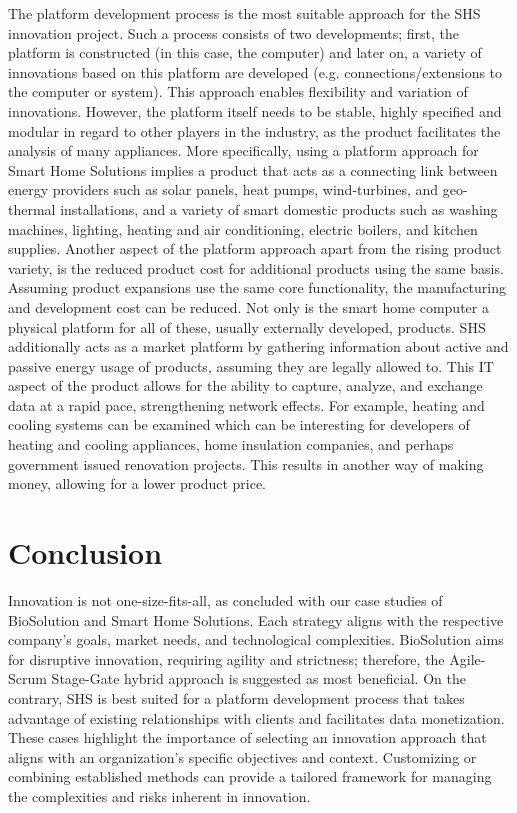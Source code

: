 \documentclass[a4paper,10pt,UTF8]{scrartcl}
\begin{document}
The platform development process is the most suitable approach for the SHS innovation project. Such a process consists of two developments; first, the platform is constructed (in this case, the computer) and later on, a variety of innovations based on this platform are developed (e.g. connections/extensions to the computer or system). This approach enables flexibility and variation of innovations. However, the platform itself needs to be stable, highly specified and modular in regard to other players in the industry, as the product facilitates the analysis of many appliances. More specifically, using a platform approach for Smart Home Solutions implies a product that acts as a connecting link between energy providers such as solar panels, heat pumps, wind-turbines, and geo-thermal installations, and a variety of smart domestic products such as washing machines, lighting, heating and air conditioning, electric boilers, and kitchen supplies. Another aspect of the platform approach apart from the rising product variety, is the reduced product cost for additional products using the same basis. Assuming product expansions use the same core functionality, the manufacturing and development cost can be reduced. Not only is the smart home computer a physical platform for all of these, usually externally developed, products. SHS additionally acts as a market platform by gathering information about active and passive energy usage of products, assuming they are legally allowed to. This IT aspect of the product allows for the ability to capture, analyze, and exchange data at a rapid pace, strengthening network effects. For example, heating and cooling systems can be examined which can be interesting for developers of heating and cooling appliances, home insulation companies, and perhaps government issued renovation projects. This results in another way of making money, allowing for a lower product price. 



\section{Conclusion}

Innovation is not one-size-fits-all, as concluded with our case studies of BioSolution and Smart Home Solutions. Each strategy aligns with the respective company's goals, market needs, and technological complexities. BioSolution aims for disruptive innovation, requiring agility and strictness; therefore, the Agile-Scrum Stage-Gate hybrid approach is suggested as most beneficial. On the contrary, SHS is best suited for a platform development process that takes advantage of existing relationships with clients and facilitates data monetization. These cases highlight the importance of selecting an innovation approach that aligns with an organization’s specific objectives and context. Customizing or combining established methods can provide a tailored framework for managing the complexities and risks inherent in innovation.










\end{document}
